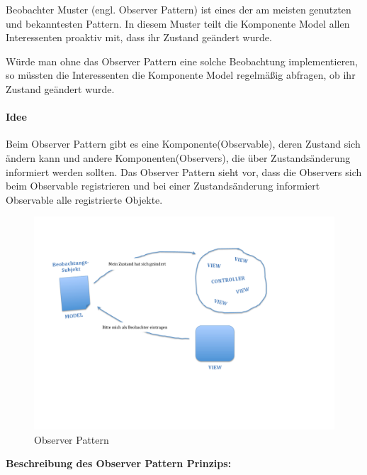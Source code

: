 Beobachter Muster (engl. Observer Pattern) ist eines der am meisten genutzten und bekanntesten Pattern. In diesem Muster teilt die Komponente Model allen Interessenten proaktiv mit, dass ihr Zustand geändert wurde.

Würde man ohne das Observer Pattern eine solche Beobachtung implementieren, so müssten die Interessenten die Komponente Model regelmäßig abfragen, ob ihr Zustand geändert wurde.
\paragraph{Idee} Beim Observer Pattern gibt es eine Komponente(Observable), deren Zustand sich ändern kann und andere Komponenten(Observers), die über Zustandsänderung informiert werden sollten. Das Observer Pattern sieht vor, dass die Observers sich beim Observable registrieren und bei einer Zustandsänderung informiert Observable alle registrierte Objekte.

\begin{figure}[H]
\centering
\includegraphics[trim = 0mm 50mm 20mm 30mm, clip, width=1.0\textwidth]{resources/observer}
\caption[Observer Pattern]{Observer Pattern}
\label{img:observer}
\end{figure}

\textbf{Beschreibung des Observer Pattern Prinzips:}


